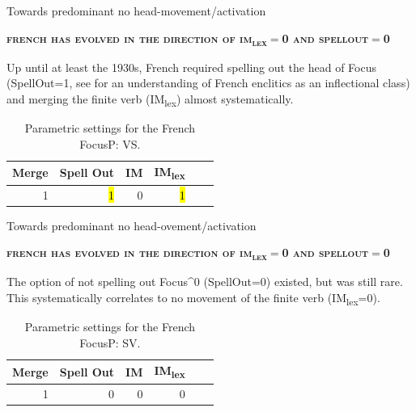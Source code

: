 \documentclass[lesson_slides]{subfiles}
\begin{document}
\begin{frame}[c]{Towards predominant no head-movement/activation}

    \textbf{\textsc{french has evolved in the direction of im\textsubscript{lex}$=$0 and spellout$=$0}}

    \noindent Up until at least the 1930s, French required spelling out the head of Focus (SpellOut=1, see \citealt{roberts2017} for an understanding of French enclitics as an inflectional class) and merging the finite verb (IM\textsubscript{lex}) almost systematically.

    \begin{table}[H]
        \centering
        \begin{tabular}{|r|r|r|r|r|r|}
        \hline
        Merge & Spell Out & IM  & IM\textsubscript{lex} \\
        \hline
        1 & \hl{1} & 0 & \hl{1} \\
        \hline
        \end{tabular}
        \caption{\label{tab:samp}Parametric settings for the French FocusP: VS.}
    \end{table}
  
\end{frame}
\begin{frame}[c]{Towards predominant no head-ovement/activation}

    \vspace*{-10mm}
    \textbf{\textsc{french has evolved in the direction of im\textsubscript{lex}$=$0 and spellout$=$0}} \pause

\noindent The option of not spelling out Focus^0 (SpellOut=0) existed, but was still rare. This systematically correlates to no movement of the finite verb (IM\textsubscript{lex}=0). \pause

\begin{table}[H]
    \centering
    \begin{tabular}{|r|r|r|r|r|r|}
    \hline
    Merge & Spell Out & IM & IM\textsubscript{lex} \\
    \hline
    1 & 0 & 0 & 0 \\
    \hline
    \end{tabular}
    \caption{\label{tab:samp}Parametric settings for the French FocusP: SV.}
\end{table}
  
\end{frame}
\end{document}
